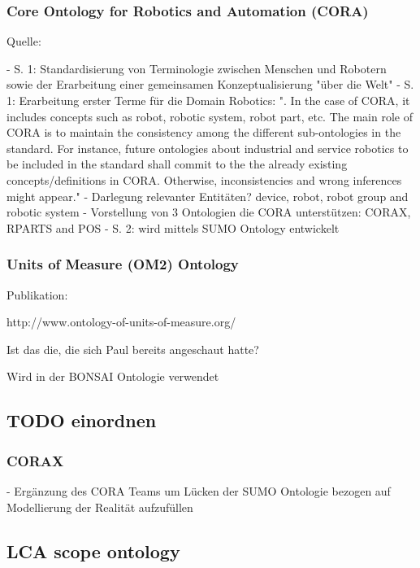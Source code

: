 \documentclass{article}
\begin{document}
\subsubsection{Core Ontology for Robotics and Automation (CORA)}

Quelle: \cite{prestes2014core}

- S. 1: Standardisierung von Terminologie zwischen Menschen und Robotern sowie der Erarbeitung einer gemeinsamen Konzeptualisierung "über die Welt"
- S. 1: Erarbeitung erster Terme für die Domain Robotics: ". In the case of CORA, it includes concepts such as robot, robotic system, robot part, etc. The main role of CORA is to maintain the consistency among the different sub-ontologies in the standard. For instance, future ontologies about industrial and service robotics to be included in the standard shall commit to the the already existing concepts/definitions in CORA. Otherwise, inconsistencies and wrong inferences might appear."
- Darlegung relevanter Entitäten? device, robot, robot group and robotic system
- Vorstellung von 3 Ontologien die CORA unterstützen: CORAX, RPARTS and POS
- S. 2: wird mittels SUMO Ontology entwickelt


\subsubsection{Units of Measure (OM2) Ontology}


Publikation: \cite{rijgersberg2013ontology}

http://www.ontology-of-units-of-measure.org/

Ist das die, die sich Paul bereits angeschaut hatte?

Wird in der BONSAI Ontologie \cite{ghose2022core} verwendet


\subsection{TODO einordnen}

\subsubsection{CORAX}

- Ergänzung des CORA Teams um Lücken der SUMO Ontologie bezogen auf Modellierung der Realität aufzufüllen

\subsection{LCA scope ontology}
\end{document}

